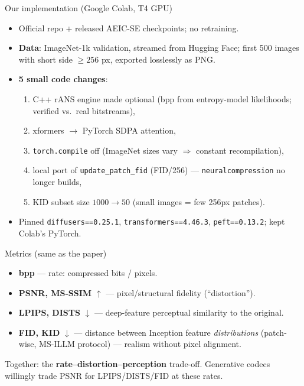 \documentclass[aspectratio=169]{beamer}
\begin{document}
\begin{frame}{Our implementation (Google Colab, T4 GPU)}
  \begin{itemize}
    \item Official repo + released AEIC-SE checkpoints; no retraining.
    \item \textbf{Data}: ImageNet-1k validation, streamed from Hugging Face;
          first 500 images with short side $\geq 256$ px, exported losslessly as PNG.
    \item \textbf{5 small code changes}:
      \begin{enumerate}
        \item C++ rANS engine made optional (bpp from entropy-model likelihoods; verified vs.\ real bitstreams),
        \item xformers $\to$ PyTorch SDPA attention,
        \item \texttt{torch.compile} off (ImageNet sizes vary $\Rightarrow$ constant recompilation),
        \item local port of \texttt{update\_patch\_fid} (FID/256) — \texttt{neuralcompression} no longer builds,
        \item KID subset size $1000 \to 50$ (small images = few 256px patches).
      \end{enumerate}
    \item Pinned \texttt{diffusers==0.25.1}, \texttt{transformers==4.46.3}, \texttt{peft==0.13.2};
          kept Colab's PyTorch.
  \end{itemize}
\end{frame}

\begin{frame}{Metrics (same as the paper)}
  \begin{itemize}
    \item \textbf{bpp} — rate: compressed bits / pixels.
    \item \textbf{PSNR, MS-SSIM} $\uparrow$ — pixel/structural fidelity (``distortion'').
    \item \textbf{LPIPS, DISTS} $\downarrow$ — deep-feature perceptual similarity to the original.
    \item \textbf{FID, KID} $\downarrow$ — distance between Inception feature \emph{distributions}
          (patch-wise, MS-ILLM protocol) — realism without pixel alignment.
  \end{itemize}
  \medskip
  Together: the \textbf{rate--distortion--perception} trade-off. Generative codecs willingly
  trade PSNR for LPIPS/DISTS/FID at these rates.
\end{frame}
\end{document}
